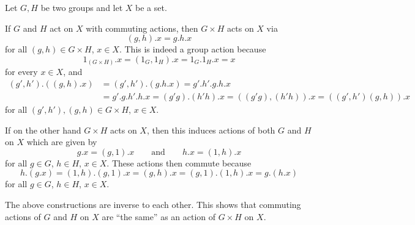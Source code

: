 \begin{remark}
  Let $G, H$ be two groups and let $X$ be a set.
  
  If $G$ and $H$ act on $X$ with commuting actions, then $G \times H$ acts on $X$ via
  \[
      (g,h).x
    = g.h.x
  \]
  for all $(g,h) \in G \times H$, $x \in X$.
  This is indeed a group action because
  \[
      1_{(G \times H)}.x
    = (1_G, 1_H).x
    = 1_G.1_H.x
    = x
  \]
  for every $x \in X$, and
  \begin{align*}
      (g', h').((g,h).x)
    &= (g', h').(g.h.x)
    = g'.h'.g.h.x
    \\
    &= g'.g.h'.h.x
    = (g'g).(h'h).x
    = ((g'g),(h'h)).x
    = ((g',h')(g,h)).x
  \end{align*}
  for all $(g',h'), (g,h) \in G \times H$, $x \in X$.
  
  If on the other hand $G \times H$ acts on $X$, then this induces actions of both $G$ and $H$ on $X$ which are given by
  \[
      g.x
    = (g,1).x
    \qquad\text{and}\qquad
      h.x
    = (1,h).x
  \]
  for all $g \in G$, $h \in H$, $x \in X$.
  These actions then commute because
  \[
      h.(g.x)
    = (1,h).(g,1).x
    = (g,h).x
    = (g,1).(1,h).x
    = g.(h.x)
  \]
  for all $g \in G$, $h \in H$, $x \in X$.
  
  The above constructions are inverse to each other.
  This shows that commuting actions of $G$ and $H$ on $X$ are “the same” as an action of $G \times H$ on $X$.
\end{remark}




